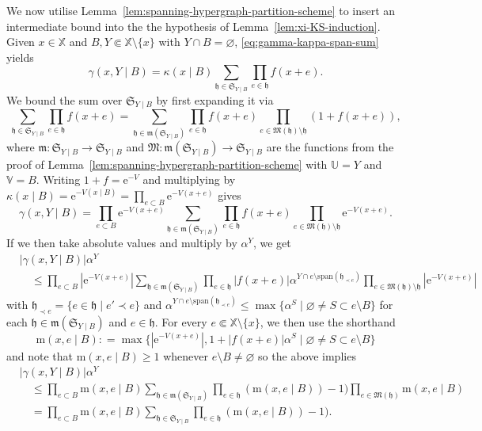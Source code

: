 \documentclass[10pt,a4paper]{amsart}
\newcommand{\e}{\mathrm{e}}
\newcommand{\X}{\mathbb X}
\newcommand{\V}{\mathbb V}
\newcommand{\U}{\mathbb U}
\begin{document}
We now utilise Lemma~\ref{lem:spanning-hypergraph-partition-scheme} to insert an intermediate bound into the the hypothesis of Lemma~\ref{lem:xi-KS-induction}. 
Given $x \in \X$ and $B, Y \Subset \X \setminus \{x\}$ with $Y \cap B = \varnothing$,  \eqref{eq:gamma-kappa-span-sum} yields
\[
	\gamma(x, Y \mid B) = \kappa(x \mid B) \sum_{\mathfrak h \in \mathfrak S_{Y \mid B}} \prod_{e \in \mathfrak h} f(x + e).
\]
We bound the sum over $\mathfrak S_{Y \mid B}$ by first expanding it via
\[
	\sum_{\mathfrak h \in \mathfrak S_{Y \mid B}} \prod_{e \in \mathfrak h} f(x + e) = \sum_{\mathfrak h \in \mathfrak m(\mathfrak S_{Y \mid B})} \prod_{e \in \mathfrak h} f(x + e) \prod_{e \in \mathfrak M(\mathfrak h) \setminus \mathfrak h} (1 + f(x + e)),
\]
where $\mathfrak m : \mathfrak S_{Y \mid B} \to \mathfrak S_{Y \mid B}$ and $\mathfrak M : \mathfrak m(\mathfrak S_{Y \mid B}) \to \mathfrak S_{Y \mid B}$ are the functions from the proof of Lemma~\ref{lem:spanning-hypergraph-partition-scheme} with $\U = Y$ and $\V = B$. 
Writing $1+f = \e^{-V}$ and multiplying by $\kappa(x \mid B) = \e^{- V(x \mid B)} = \prod_{e \subset B} \e^{- V(x + e)}$ gives
\[
	\gamma(x, Y \mid B) = \prod_{e \subset B} \e^{- V(x + e)} \sum_{\mathfrak h \in \mathfrak m(\mathfrak S_{Y \mid B})} \prod_{e \in \mathfrak h} f(x + e) \prod_{e \in \mathfrak M(\mathfrak h) \setminus \mathfrak h} \e^{-V(x + e)}.
\]
If we then take absolute values and multiply by $\alpha^Y$, we get
\begin{align*}
	& |\gamma(x, Y \mid B)| \alpha^Y \\
	& \quad \leq \prod_{e \subset B} |\e^{- V(x + e)}| \sum_{\mathfrak h \in \mathfrak m(\mathfrak S_{Y \mid B})} \prod_{e \in \mathfrak h} |f(x + e)| \alpha^{Y \cap e \setminus \mathrm{span}(\mathfrak h_{\prec e})} \prod_{e \in \mathfrak M(\mathfrak h) \setminus \mathfrak h} |\e^{-V(x + e)}|
\end{align*}
with $\mathfrak h_{\prec e} = \{e \in \mathfrak h \mid e' \prec e\}$ and 
$\alpha^{Y \cap e \setminus \mathrm{span}(\mathfrak h_{\prec e})} \leq \max\{\alpha^S \mid \varnothing \neq S \subset e \setminus B\}$ for each $\mathfrak h \in \mathfrak m(\mathfrak S_{Y \mid B})$ and $e \in \mathfrak h$. 
For every $e \Subset \X \setminus \{x\}$, we then use the shorthand
\[
	\mathrm{m}(x, e \mid B) : = \max\{|\e^{-V(x+e)}|, 1 + |f(x + e)| \alpha^S \mid \varnothing \neq S \subset e \setminus B\}
\]
and note that $\mathrm{m}(x, e \mid B) \geq 1$ whenever $e \setminus B \neq \varnothing$ so the above implies
\begin{align*}
	& |\gamma(x, Y \mid B)| \alpha^Y \\
	& \quad \leq \prod_{e \subset B} \mathrm{m}(x, e \mid B) \sum_{\mathfrak h \in \mathfrak m(\mathfrak S_{Y \mid B})} \prod_{e \in \mathfrak h} (\mathrm{m}(x, e \mid B)) - 1) \prod_{e \in \mathfrak M(\mathfrak h)} \mathrm{m}(x, e \mid B) \\
	& \quad = \prod_{e \subset B} \mathrm{m}(x, e \mid B) \sum_{\mathfrak h \in \mathfrak S_{Y \mid B}} \prod_{e \in \mathfrak h} (\mathrm{m}(x, e \mid B)) - 1).
\end{align*}
\end{document}
